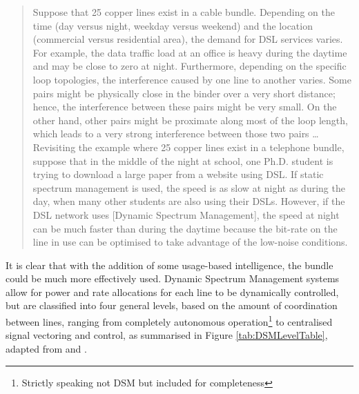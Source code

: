 \begin{quotation}
Suppose that 25 copper lines exist in a cable bundle. Depending on the time (day versus night, weekday versus weekend) and the location (commercial versus residential area), the demand for DSL services varies. For example, the data traffic load at an office is heavy during the daytime and may be close to zero at night. Furthermore, depending on the specific loop topologies, the interference caused by one line to another varies. Some pairs might be physically close in the binder over a very short distance; hence, the interference between these pairs might be very small. On the other hand, other pairs might be proximate along most of the loop length, which leads to a very strong interference between those two pairs
\ldots
Revisiting the example where 25 copper lines exist in a telephone bundle, suppose that in the middle of the night at school, one Ph.D. student is trying to download a large paper from a website using DSL. If static spectrum management is used, the speed is as slow at night as during the day, when many other students are also using their DSLs. However, if the DSL network uses [Dynamic Spectrum Management], the speed at night can be much faster than during the daytime because the bit-rate on the line in use can be optimised to take advantage of the low-noise conditions.
\end{quotation}

It is clear that with the addition of some usage-based intelligence, the bundle could be much more effectively used. Dynamic Spectrum Management systems allow for power and rate allocations for each line to be dynamically controlled, but are classified into four general levels, based on the amount of coordination between lines, ranging from completely autonomous operation\footnote{Strictly speaking not DSM but included for completeness} to centralised signal vectoring and control, as summarised in Figure \ref{tab:DSMLevelTable}, adapted from \cite{JC06} and \cite{AM09}.

